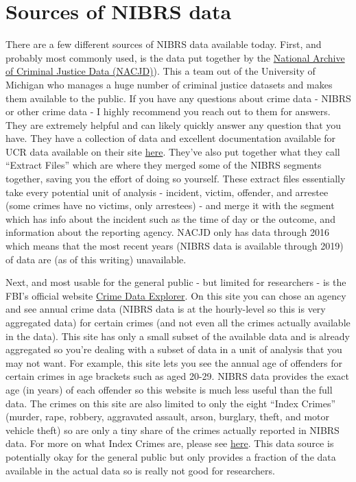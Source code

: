 \documentclass[
  12pt,
  openany]{book}
\begin{document}
\hypertarget{sources-of-nibrs-data}{%
\section{Sources of NIBRS data}\label{sources-of-nibrs-data}}

There are a few different sources of NIBRS data available today. First, and probably most commonly used, is the data put together by the \href{https://www.icpsr.umich.edu/web/pages/NACJD/index.html}{National Archive of Criminal Justice Data (NACJD)}). This a team out of the University of Michigan who manages a huge number of criminal justice datasets and makes them available to the public. If you have any questions about crime data - NIBRS or other crime data - I highly recommend you reach out to them for answers. They are extremely helpful and can likely quickly answer any question that you have. They have a collection of data and excellent documentation available for UCR data available on their site \href{https://www.icpsr.umich.edu/web/NACJD/series/128}{here}. They've also put together what they call ``Extract Files'' which are where they merged some of the NIBRS segments together, saving you the effort of doing so yourself. These extract files essentially take every potential unit of analysis - incident, victim, offender, and arrestee (some crimes have no victims, only arrestees) - and merge it with the segment which has info about the incident such as the time of day or the outcome, and information about the reporting agency. NACJD only has data through 2016 which means that the most recent years (NIBRS data is available through 2019) of data are (as of this writing) unavailable.

Next, and most usable for the general public - but limited for researchers - is the FBI's official website \href{https://crime-data-explorer.fr.cloud.gov/}{Crime Data Explorer}. On this site you can chose an agency and see annual crime data (NIBRS data is at the hourly-level so this is very aggregated data) for certain crimes (and not even all the crimes actually available in the data). This site has only a small subset of the available data and is already aggregated so you're dealing with a subset of data in a unit of analysis that you may not want. For example, this site lets you see the annual age of offenders for certain crimes in age brackets such as aged 20-29. NIBRS data provides the exact age (in years) of each offender so this website is much less useful than the full data. The crimes on this site are also limited to only the eight ``Index Crimes'' (murder, rape, robbery, aggravated assault, arson, burglary, theft, and motor vehicle theft) so are only a tiny share of the crimes actually reported in NIBRS data. For more on what Index Crimes are, please see \href{https://ucrbook.com/ucrGeneral.html\#indexCrimes}{here}. This data source is potentially okay for the general public but only provides a fraction of the data available in the actual data so is really not good for researchers.
\end{document}
